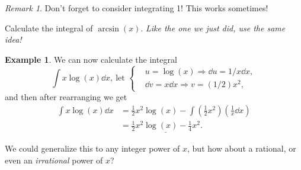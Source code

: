 \documentclass[12pt]{article}
\theoremstyle{plain}
\theoremstyle{definition}
\newtheorem{Ex}[Th]{Example}           %
\theoremstyle{remark}
\newtheorem*{Rmk}{Remark}      %
\renewcommand{\:}{\colon}           %
\newcommand{\un}[1]{\underline{#1}}
\newcommand{\half}{\frac12}
\renewcommand{\.}{\Cdot}                %
\newcommand{\To}{\Rightarrow}
\begin{document}
\begin{multicols}{2}
\begin{Rmk}
  Don't forget to consider integrating 1! This works sometimes!
\end{Rmk}

\begin{ptcbP}
  Calculate the integral of $\arcsin(x)$.
  \emph{Like the one we just did, use the same idea!}
\end{ptcbP}

\begin{Ex}
  We can now calculate the integral 
  $$\int x\log (x)\dd x,\ \text{let }
  \left\lbrace
  \begin{aligned}
    &u=\log(x)\To\dd u=1/x\dd x,\\
    &\dd v= x\dd x\To v=(1/2)x^2,
  \end{aligned}
  \right.
  $$
  and then after rearranging we get
  \begin{align*}
    \int x\log (x)\dd x&=\half x^2\log(x)-\int\left(\frac{1}{2}x^2\right)\left(\frac{1}{x}\dd x\right)\\
    &=\un{\half x^2\log(x)-\frac{1}{4}x^2}.
  \end{align*}
\end{Ex}

We could generalize this to any integer power of $x$, but how about a rational, or even an \emph{irrational} power of $x$?


\end{multicols}
\end{document}
